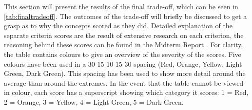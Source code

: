 This section will present the results of the final trade-off, which can be seen in \autoref{tab:finaltradeoff}. The outcomes of the trade-off will briefly be discussed to get a grasp as to why the concepts scored as they did. Detailed explanation of the separate criteria scores are the result of extensive research on each criterion, the reasoning behind these scores can be found in the Midterm Report \cite{midterm}. For clarity, the table contains colours to give an overview of the severity of the scores. Five colours have been used in a 30-15-10-15-30 spacing (Red, Orange, Yellow, Light Green, Dark Green). This spacing has been used to show more detail around the average than around the extremes. In the event that the table cannot be viewed in colour, each score has a superscript showing which category it scores: 1 = Red, 2 = Orange, 3 = Yellow, 4 = Light Green, 5 = Dark Green. 

